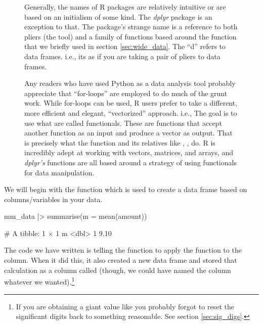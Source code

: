 \begin{figure}[b]
    \centering
\begin{mdframed}[style = miscFrame, frametitle = Box 3.1: Why is it called \textit{dplyr}?]

Generally, the names of R packages are relatively intuitive or are based on an initialism of some kind. The \textit{dplyr} package is an exception to that. The package's strange name is a reference to both pliers (the tool) and a family of functions based around the  function that we briefly used in section \ref{sec:wide_data}. The ``d'' refers to data frames. i.e., its as if you are taking a pair of pliers to data frames.

\vspace{1em}

Any readers who have used Python as a data analysis tool probably appreciate that ``for-loops'' are employed to do much of the grunt work. While for-loops can be used, R users prefer to take a different, more efficient and elegant, ``vectorized'' approach. i.e., The goal is to use what are called \glspl{functional}. These are functions that accept another function as an input and produce a vector as output. That is precisely what the  function and its relatives like , ,  do. R is incredibly adept at working with vectors, matrices, and arrays, and \textit{dplyr's} functions are all based around a strategy of using functionals for data manipulation.

\end{mdframed}
\end{figure}

We will begin with the  function which is used to create a data frame based on columns/variables in your data.

\begin{inR}
mm_data |> 
  summarise(m = mean(amount))
\end{inR}

\begin{outR}
# A tibble: 1 × 1
      m
  <dbl>
1  9.10
\end{outR}

The code we have written is telling the  function to apply the  function to the  column. When it did this, it also created a new data frame and stored that calculation as a column called  (though, we could have named the column whatever we wanted).\footnote{If you are obtaining a giant value like  you probably forgot to reset the significant digits back to something reasonable. See section \ref{sec:sig_digs}.}

